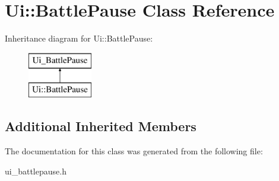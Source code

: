\hypertarget{class_ui_1_1_battle_pause}{\section{Ui\-:\-:Battle\-Pause Class Reference}
\label{class_ui_1_1_battle_pause}
}
Inheritance diagram for Ui\-:\-:Battle\-Pause\-:\begin{figure}[H]
\begin{center}
\leavevmode
\includegraphics[height=2.000000cm]{class_ui_1_1_battle_pause}
\end{center}
\end{figure}
\subsection*{Additional Inherited Members}


The documentation for this class was generated from the following file\-:\begin{DoxyCompactItemize}
\item 
ui\-\_\-battlepause.\-h\end{DoxyCompactItemize}
